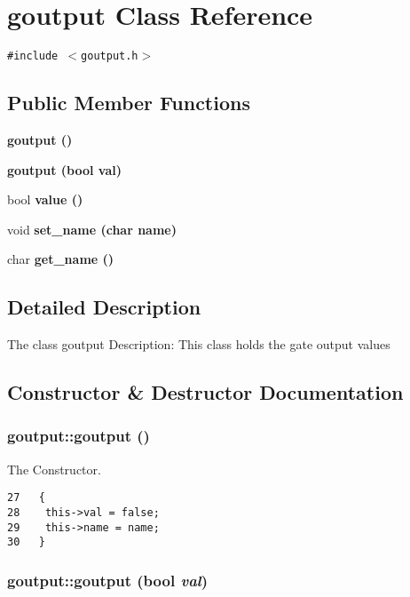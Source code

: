 \section{goutput Class Reference}
\label{classgoutput}
{\tt \#include $<$goutput.h$>$}

\subsection*{Public Member Functions}
\begin{CompactItemize}
\item 
\bf{goutput} ()
\item 
\bf{goutput} (bool val)
\item 
bool \bf{value} ()
\item 
void \bf{set\_\-name} (char name)
\item 
char \bf{get\_\-name} ()
\end{CompactItemize}


\subsection{Detailed Description}
The class goutput Description: This class holds the gate output values 



\subsection{Constructor \& Destructor Documentation}
\subsubsection{\setlength{\rightskip}{0pt plus 5cm}goutput::goutput ()\hspace{0.3cm}{\tt  [inline]}}\label{classgoutput_b1a54ad7dd6633382943055bd5bd6138}


The Constructor. 

\begin{Code}\begin{verbatim}27   {
28    this->val = false; 
29    this->name = name;
30   }
\end{verbatim}\end{Code}


\subsubsection{\setlength{\rightskip}{0pt plus 5cm}goutput::goutput (bool {\em val})\hspace{0.3cm}{\tt  [inline]}}\label{classgoutput_35f3446ffe89070f7c82047b75712c67}


